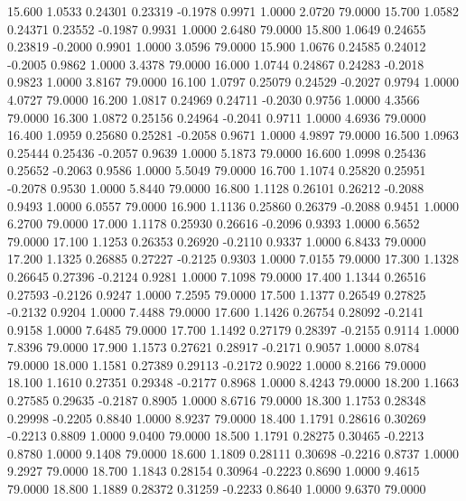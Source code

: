   15.600   1.0533   0.24301   0.23319  -0.1978   0.9971   1.0000   2.0720  79.0000
  15.700   1.0582   0.24371   0.23552  -0.1987   0.9931   1.0000   2.6480  79.0000
  15.800   1.0649   0.24655   0.23819  -0.2000   0.9901   1.0000   3.0596  79.0000
  15.900   1.0676   0.24585   0.24012  -0.2005   0.9862   1.0000   3.4378  79.0000
  16.000   1.0744   0.24867   0.24283  -0.2018   0.9823   1.0000   3.8167  79.0000
  16.100   1.0797   0.25079   0.24529  -0.2027   0.9794   1.0000   4.0727  79.0000
  16.200   1.0817   0.24969   0.24711  -0.2030   0.9756   1.0000   4.3566  79.0000
  16.300   1.0872   0.25156   0.24964  -0.2041   0.9711   1.0000   4.6936  79.0000
  16.400   1.0959   0.25680   0.25281  -0.2058   0.9671   1.0000   4.9897  79.0000
  16.500   1.0963   0.25444   0.25436  -0.2057   0.9639   1.0000   5.1873  79.0000
  16.600   1.0998   0.25436   0.25652  -0.2063   0.9586   1.0000   5.5049  79.0000
  16.700   1.1074   0.25820   0.25951  -0.2078   0.9530   1.0000   5.8440  79.0000
  16.800   1.1128   0.26101   0.26212  -0.2088   0.9493   1.0000   6.0557  79.0000
  16.900   1.1136   0.25860   0.26379  -0.2088   0.9451   1.0000   6.2700  79.0000
  17.000   1.1178   0.25930   0.26616  -0.2096   0.9393   1.0000   6.5652  79.0000
  17.100   1.1253   0.26353   0.26920  -0.2110   0.9337   1.0000   6.8433  79.0000
  17.200   1.1325   0.26885   0.27227  -0.2125   0.9303   1.0000   7.0155  79.0000
  17.300   1.1328   0.26645   0.27396  -0.2124   0.9281   1.0000   7.1098  79.0000
  17.400   1.1344   0.26516   0.27593  -0.2126   0.9247   1.0000   7.2595  79.0000
  17.500   1.1377   0.26549   0.27825  -0.2132   0.9204   1.0000   7.4488  79.0000
  17.600   1.1426   0.26754   0.28092  -0.2141   0.9158   1.0000   7.6485  79.0000
  17.700   1.1492   0.27179   0.28397  -0.2155   0.9114   1.0000   7.8396  79.0000
  17.900   1.1573   0.27621   0.28917  -0.2171   0.9057   1.0000   8.0784  79.0000
  18.000   1.1581   0.27389   0.29113  -0.2172   0.9022   1.0000   8.2166  79.0000
  18.100   1.1610   0.27351   0.29348  -0.2177   0.8968   1.0000   8.4243  79.0000
  18.200   1.1663   0.27585   0.29635  -0.2187   0.8905   1.0000   8.6716  79.0000
  18.300   1.1753   0.28348   0.29998  -0.2205   0.8840   1.0000   8.9237  79.0000
  18.400   1.1791   0.28616   0.30269  -0.2213   0.8809   1.0000   9.0400  79.0000
  18.500   1.1791   0.28275   0.30465  -0.2213   0.8780   1.0000   9.1408  79.0000
  18.600   1.1809   0.28111   0.30698  -0.2216   0.8737   1.0000   9.2927  79.0000
  18.700   1.1843   0.28154   0.30964  -0.2223   0.8690   1.0000   9.4615  79.0000
  18.800   1.1889   0.28372   0.31259  -0.2233   0.8640   1.0000   9.6370  79.0000
